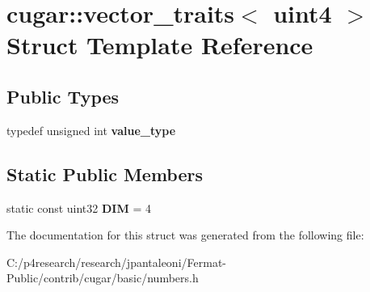 \hypertarget{structcugar_1_1vector__traits_3_01uint4_01_4}{}\section{cugar\+:\+:vector\+\_\+traits$<$ uint4 $>$ Struct Template Reference}
\label{structcugar_1_1vector__traits_3_01uint4_01_4}
\subsection*{Public Types}
\begin{DoxyCompactItemize}
\item 
\mbox{\label{structcugar_1_1vector__traits_3_01uint4_01_4_a8e31a2e44a5b5fb9ebf6bee712bb39b5}} 
typedef unsigned int {\bfseries value\+\_\+type}
\end{DoxyCompactItemize}
\subsection*{Static Public Members}
\begin{DoxyCompactItemize}
\item 
\mbox{\label{structcugar_1_1vector__traits_3_01uint4_01_4_adb347b9cc314589e9fab222c74a9ae7c}} 
static const uint32 {\bfseries D\+IM} = 4
\end{DoxyCompactItemize}


The documentation for this struct was generated from the following file\+:\begin{DoxyCompactItemize}
\item 
C\+:/p4research/research/jpantaleoni/\+Fermat-\/\+Public/contrib/cugar/basic/numbers.\+h\end{DoxyCompactItemize}

